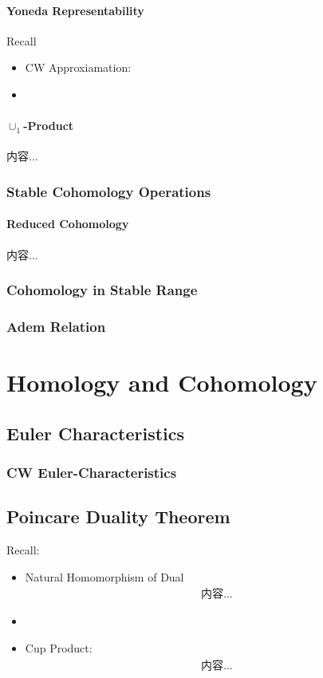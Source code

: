 \documentclass[Total.tex]{subfiles}
\begin{document}
			\subsubsection{Yoneda Representability}
			
			Recall
			\begin{itemize}
				\item CW Approxiamation:
				\item 
			\end{itemize}
			
			\subsubsection{$\cup_1$-Product}
			\begin{Def}
				内容...
			\end{Def}
			\subsection{Stable Cohomology Operations}
			\subsubsection{Reduced Cohomology}
			\begin{Def}
				内容...
			\end{Def}
			\subsection{Cohomology in Stable Range}
			\subsection{Adem Relation }
	\chapter{Homology and Cohomology}
		\section{Euler Characteristics}
			\subsection{CW Euler-Characteristics}
		\section{Poincare Duality Theorem}
			Recall:
			\begin{itemize}
				\item Natural Homomorphism of Dual
				\begin{gather*}
					内容...
				\end{gather*}
				\item 
				\item Cup Product:
				\begin{gather*}
					内容...
				\end{gather*}
			\end{itemize}
			
\end{document}
